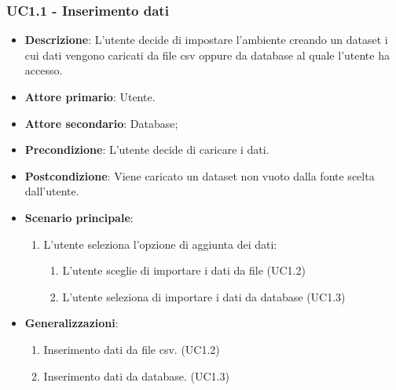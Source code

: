 \subsubsection{UC1.1 - Inserimento dati}
\label{ssub:UC1.1}
\begin{itemize}
    \item \textbf{Descrizione}: L'utente decide di impostare l'ambiente creando un dataset i cui 
                                dati vengono caricati da file csv oppure da database al quale l'utente ha accesso.

    \item \textbf{Attore primario}: Utente.
    \item \textbf{Attore secondario}: Database;
    
    \item \textbf{Precondizione}:   L'utente decide di caricare i dati.

    \item \textbf{Postcondizione}:  Viene caricato un dataset non vuoto dalla fonte scelta dall'utente. 

	\item \textbf{Scenario principale}:
		\begin{enumerate}
			\item L'utente seleziona l'opzione di aggiunta dei dati:
            \begin{enumerate}
                \item L'utente sceglie di importare i dati da file (UC1.2)
                \item L'utente seleziona di importare i dati da database (UC1.3)
            \end{enumerate}
        \end{enumerate}

        \item \textbf{Generalizzazioni}:
        \begin{enumerate}
            \item Inserimento dati da file csv. (UC1.2)
            \item Inserimento dati da database. (UC1.3)
        \end{enumerate}
\end{itemize}


